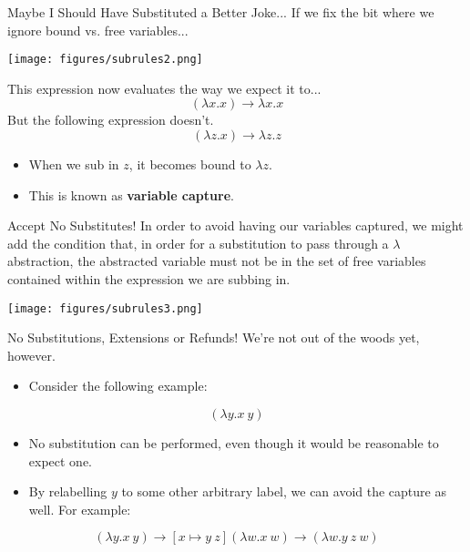 \documentclass[11pt]{beamer}
\begin{document}
\begin{frame}[fragile=singleslide]{Maybe I Should Have Substituted a Better Joke...}
If we fix the bit where we ignore bound vs. free variables...

\texttt{[image: figures/subrules2.png]}

This expression now evaluates the way we expect it to...
\begin{equation}
[x \mapsto y](\lambda x. x) \rightarrow \lambda x. x
\end{equation}
But the following expression doesn't.
\begin{equation}
[x \mapsto z](\lambda z. x) \rightarrow \lambda z. z
\end{equation}
\vspace{-1.5em}
\begin{itemize}
\item When we sub in $z$, it becomes bound to $\lambda z$.  
\item This is known as \textbf{variable capture}.
\end{itemize}
\end{frame}


\begin{frame}[fragile=singleslide]{Accept No Substitutes!}
In order to avoid having our variables captured, we might add the condition that, in order for a substitution to pass through a $\lambda$ abstraction, the abstracted variable must not be in the set of free variables contained within the expression we are subbing in.

\texttt{[image: figures/subrules3.png]}

\end{frame}

\begin{frame}[fragile=singleslide]{No Substitutions, Extensions or Refunds!}
We're not out of the woods yet, however.  
\begin{itemize}
\item Consider the following example:
\end{itemize}
\begin{equation}
[x \mapsto y\:z](\lambda y. x\:y)
\end{equation}
\begin{itemize}
\item No substitution can be performed, even though it would be reasonable to expect one.  
\item By relabelling $y$ to some other arbitrary label, we can avoid the capture as well.  For example:
\end{itemize}
\begin{equation}
[x \mapsto y\:z](\lambda y. x\:y) \rightarrow [x \mapsto y\:z](\lambda w. x\:w) \rightarrow (\lambda w. y\:z\:w)
\end{equation}

\end{frame}
\end{document}
